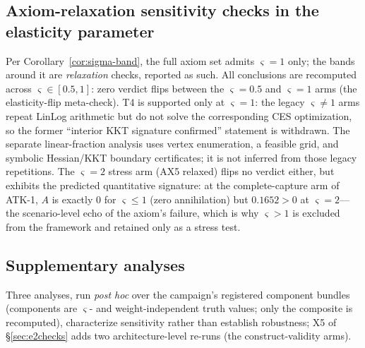 \subsection{Axiom-relaxation sensitivity checks in the elasticity parameter}
\label{sec:sigma}

Per Corollary~\ref{cor:sigma-band}, the full axiom set admits $\varsigma=1$
only; the bands around it are \emph{relaxation} checks, reported as such. All
conclusions are recomputed across $\varsigma\in[0.5,1]$: zero verdict flips
between the $\varsigma=0.5$ and $\varsigma=1$ arms (the elasticity-flip
meta-check). T4 is supported only at $\varsigma=1$: the legacy
$\varsigma\neq1$ arms repeat LinLog arithmetic but do not solve the
corresponding CES optimization, so the former ``interior KKT signature
confirmed'' statement is withdrawn. The separate linear-fraction analysis
uses vertex enumeration, a feasible grid, and symbolic Hessian/KKT boundary
certificates; it is not inferred from those legacy repetitions.
The $\varsigma=2$ stress arm
(AX5 relaxed) flips no verdict either, but exhibits the predicted quantitative
signature: at the complete-capture arm of ATK-1, $A$ is exactly $0$
for $\varsigma\le1$ (zero annihilation) but $0.1652>0$ at
$\varsigma=2$---the
scenario-level echo of the axiom's failure, which is why
$\varsigma>1$ is
excluded from the framework and retained only as a stress test.

\subsection{Supplementary analyses}\label{sec:supplement}

Three analyses, run \emph{post hoc} over the campaign's registered component
bundles (components are $\varsigma$- and weight-independent truth values;
only the composite is recomputed), characterize sensitivity rather than
establish robustness; X5 of
\S\ref{sec:e2checks} adds two architecture-level re-runs (the
construct-validity arms).

